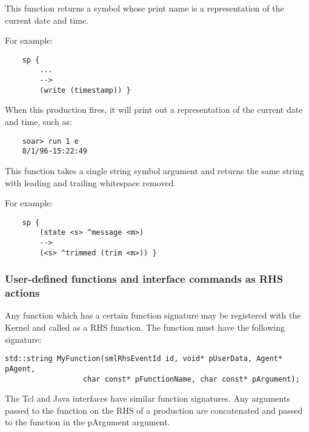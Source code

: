\begin{description}
\item [\soarb{timestamp} --- ] 
	This function returns a symbol whose print name is a representation of the current date and time. 

	For example:
	
	\begin{verbatim}
	sp {
	    ...
	    -->
	    (write (timestamp)) }
	\end{verbatim}
	
	When this production fires, it will print out a representation of the current date and time, such as:
	
	\begin{verbatim}
	soar> run 1 e
	8/1/96-15:22:49
	\end{verbatim}


\item [\soarb{trim} --- ] 
	This function takes a single string symbol argument and returns the same string with leading and trailing whitespace removed.

	For example:
	
	\begin{verbatim}
	sp {
	    (state <s> ^message <m>)
	    -->
	    (<s> ^trimmed (trim <m>)) }
	\end{verbatim}

\end{description}

\subdivider
\subsubsection*{User-defined functions and interface commands as RHS actions}

Any function which has a certain function signature may be registered with the Kernel and called as a RHS function.  The function must have the following signature:

\begin{verbatim}
std::string MyFunction(smlRhsEventId id, void* pUserData, Agent* pAgent,
                  char const* pFunctionName, char const* pArgument);
\end{verbatim}

The Tcl and Java interfaces have similar function signatures. Any arguments passed to the function on the RHS of a production are concatenated and passed to the function in the pArgument argument.

